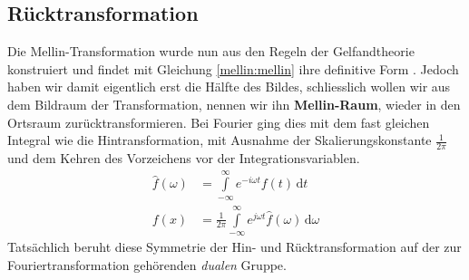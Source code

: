 \subsection{Rücktransformation
\label{mellin:subsection:ruecktransformation}}
Die Mellin-Transformation wurde nun aus den Regeln der Gelfandtheorie konstruiert und findet mit Gleichung \eqref{mellin:mellin} ihre
definitive Form .
Jedoch haben wir damit eigentlich erst die Hälfte des Bildes, schliesslich wollen wir aus dem Bildraum der Transformation, 
nennen wir ihn \textbf{Mellin-Raum}, wieder in den Ortsraum zurücktransformieren. 
Bei Fourier ging dies mit dem fast gleichen Integral wie die Hintransformation, mit Ausnahme der Skalierungskonstante $\frac{1}{2\pi}$
und dem Kehren des Vorzeichens vor der Integrationsvariablen.
\[
\begin{aligned}
    \hat{f}(\omega) &= \int\limits_{-\infty}^{\infty} e^{-i\omega{}t} f(t) \,\mathrm{d}t \\
    f(x) &= \frac{1}{2\pi} \int\limits_{-\infty}^{\infty} e^{j\omega t} \hat{f}(\omega) \,\mathrm{d}\omega
\end{aligned}
\]
Tatsächlich beruht diese Symmetrie der Hin- und Rücktransformation auf der zur Fouriertransformation gehörenden \emph{dualen} Gruppe.

